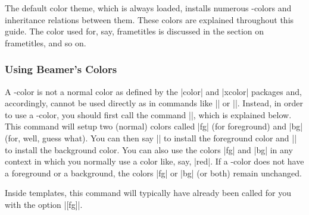 The default color theme, which is always loaded, installs numerous \beamer-colors and inheritance relations between them. These colors are explained throughout this guide. The color used for, say, frametitles is discussed in the section on frametitles, and so on.

\subsubsection{Using Beamer's Colors}

A \beamer-color is not a normal color as defined by the |color| and |xcolor| packages and, accordingly, cannot be used directly as in commands like |\color| or ||. Instead, in order to use a \beamer-color, you should first call the command |\usebeamercolor|, which is explained below. This command will setup two (normal) colors called |fg| (for foreground) and |bg| (for, well, guess what). You can then say |\color{fg}| to install the foreground color and |\color{bg}| to install the background color. You can also use the colors |fg| and |bg| in any context in which you normally use a color like, say, |red|. If a \beamer-color does not have a foreground or a background, the colors |fg| or |bg| (or both) remain unchanged.

Inside templates, this command will typically have already been called for you with the option |[fg]|.

